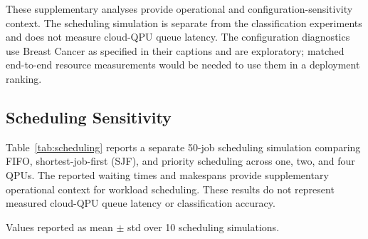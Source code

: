 These supplementary analyses provide operational and configuration-sensitivity context. The scheduling simulation is separate from the classification experiments and does not measure cloud-QPU queue latency. The configuration diagnostics use Breast Cancer as specified in their captions and are exploratory; matched end-to-end resource measurements would be needed to use them in a deployment ranking.

\subsection{Scheduling Sensitivity}
\label{sec:scheduling}

Table~\ref{tab:scheduling} reports a separate 50-job scheduling simulation comparing FIFO, shortest-job-first (SJF), and priority scheduling across one, two, and four QPUs. The reported waiting times and makespans provide supplementary operational context for workload scheduling. These results do not represent measured cloud-QPU queue latency or classification accuracy.

\begin{table}[H]
  \centering
  \caption{Supplementary scheduling comparison (50 jobs, varying QPU count)}
  \label{tab:scheduling}
  \small
  \setlength{\tabcolsep}{4pt}
  \begin{tablenotes}
    \small
    \item Values reported as mean $\pm$ std over 10 scheduling simulations.
  \end{tablenotes}
\end{table}

